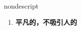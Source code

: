 
\begin{frame}
{\huge nondescript}
\begin{center}
\begin{enumerate}\Large
  \item \textbf{平凡的，不吸引人的}
\end{enumerate}
\end{center}
\end{frame}

